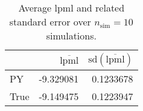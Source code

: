 \begin{table}[H]

\caption{Average lpml and related standard error over $n_{\text{sim}} = 10$ simulations.}
\centering
\begin{tabular}[t]{lrr}
\toprule
  & $\overbar{\text{lpml}}$ & $\text{sd}(\overbar{\text{lpml}})$\\
\midrule
PY & -9.329081 & 0.1233678\\
True & -9.149475 & 0.1223947\\
\bottomrule
\end{tabular}
\end{table}
